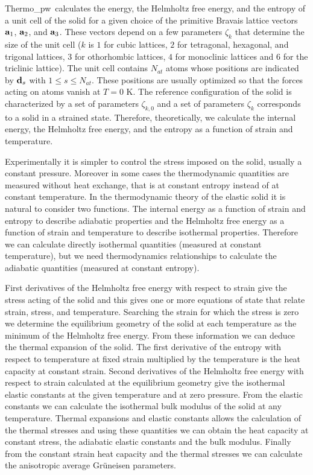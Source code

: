 \documentclass[12pt,a4paper,twoside]{report}
\def\tpw{{\sc Thermo}\_{\sc pw}}
\begin{document}
\tpw\ calculates the energy, the Helmholtz free energy, and the
entropy of a unit cell of the solid for a given choice of the primitive 
Bravais lattice vectors ${\bf a}_1$, ${\bf a}_2$, and ${\bf a}_3$. These
vectors depend on a few parameters $\zeta_k$ that determine the size 
of the unit cell ($k$ is $1$ for cubic lattices, $2$ for tetragonal, hexagonal,
and trigonal lattices, $3$ for othorhombic lattices, $4$ for monoclinic
lattices and $6$ for the triclinic lattice).
The unit cell contains $N_{at}$ atoms
whose positions are indicated by ${\bf d}_s$ with $1\le s\le N_{at}$.
These positions are usually optimized so that the forces acting on atoms 
vanish at $T=0$ K.
The reference configuration of the solid is
characterized by a set of parameters $\zeta_{k,0}$ and a set of parameters 
$\zeta_k$ corresponds to a solid in a strained state.
Therefore, theoretically, we calculate the 
internal energy, the Helmholtz free energy, and the entropy as a 
function of strain and temperature.

Experimentally it is simpler to control the stress imposed on the solid,
usually a constant pressure.
Moreover in some cases the thermodynamic quantities are measured without 
heat exchange, that is at constant entropy instead of at constant temperature. 
In the thermodynamic theory of the elastic solid it is natural to consider two
functions. The internal energy as a function of strain and entropy  
to describe adiabatic properties and the Helmholtz free energy as a function
of strain and temperature to describe isothermal properties.
Therefore we can calculate directly isothermal quantities (measured at constant
temperature), but we need thermodynamics relationships to calculate
the adiabatic quantities (measured at constant entropy).

First derivatives of the Helmholtz free energy with respect to strain
give the stress acting of the solid and this gives one or more equations
of state that relate strain, stress, and temperature. 
Searching the strain for which the stress is zero we determine the 
equilibrium geometry of the solid at each temperature as the minimum of 
the Helmholtz free energy. From these information we can deduce the
thermal expansion of the solid. The first derivative of the entropy 
with respect to temperature at fixed strain multiplied by the temperature
is the heat capacity at constant strain. Second derivatives of the 
Helmholtz free energy with 
respect to strain calculated at the equilibrium geometry give the 
isothermal elastic constants at the given temperature and at zero pressure. 
From the elastic constants we can calculate the isothermal bulk modulus 
of the solid at any temperature. 
Thermal expansions and elastic constants allows the calculation of the thermal
stresses and using these quantities we can obtain the heat capacity at
constant stress, the adiabatic elastic constants and the bulk modulus.
Finally from the constant strain heat capacity and the thermal stresses 
we can calculate the anisotropic average Gr\"uneisen parameters.
\end{document}
